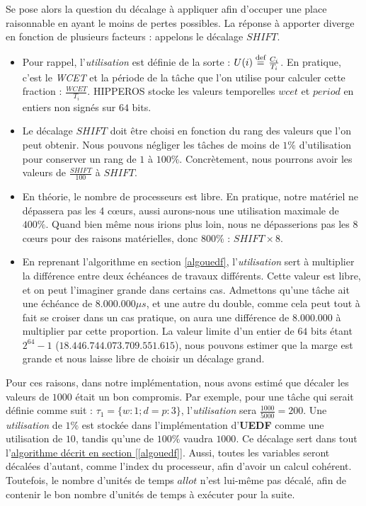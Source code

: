 		Se pose alors la question du décalage à appliquer afin d'occuper une place raisonnable en ayant 
		le moins de pertes possibles.  
		La réponse à apporter diverge en fonction de plusieurs facteurs :
		appelons le décalage $SHIFT$.
		\begin{itemize}
			\setlength\itemsep{0.1em}
			\item Pour rappel, l'\textit{utilisation} est définie de la sorte : $U(i) \stackrel{\text{def}}{=} \frac{C_i}{T_i}$. 
			En pratique, c'est le \textit{WCET} et la période de la tâche que l'on utilise pour calculer cette fraction : 
			$\frac{WCET}{T_i}$.
			HIPPEROS stocke les valeurs temporelles $wcet$ et $period$ en entiers non signés sur $64$ bits.
			
			\item Le décalage $SHIFT$ doit être choisi en fonction du rang des valeurs que l'on peut obtenir.
			Nous pouvons négliger les tâches de moins de $1 \%$ d'utilisation pour conserver un rang de $1$ à $100\%$.
			Concrètement, nous pourrons avoir les valeurs de $\frac{SHIFT}{100}$ à $SHIFT$.
			\item En théorie, le nombre de processeurs est libre. En pratique, 
			notre matériel ne dépassera pas les 4 cœurs, aussi aurons-nous une utilisation maximale de $400\%$.
			Quand bien même nous irions plus loin, nous ne dépasserions pas les 8 cœurs pour des raisons 
			matérielles, donc 800\% : $SHIFT \times 8$.
			\item En reprenant l'algorithme en section \ref{algouedf}, 
			l'\textit{utilisation} sert à multiplier la différence entre deux échéances de travaux différents.
			Cette valeur est libre, et on peut l'imaginer grande dans certains cas. 
			Admettons qu'une tâche ait une échéance de $8.000.000 \mu s$, et une autre du double, comme cela 
			peut tout à fait se croiser dans un cas pratique, on aura une différence de $8.000.000$ à multiplier
			par cette proportion. 
			La valeur limite d'un entier de $64$ bits étant $2^{64} - 1$ ($18.446.744.073.709.551.615$), nous pouvons estimer que la marge 
			est grande et nous laisse libre de choisir un décalage grand.
		\end{itemize}
		Pour ces raisons, dans notre implémentation, nous avons estimé que décaler les valeurs de $1000$ était un bon compromis.
		Par exemple, pour une tâche qui serait définie comme suit : $\tau_1 = \{w:1; d=p : 3\}$, 
		l'\textit{utilisation} sera $\frac{1000}{5000} = 200$.
		Une \textit{utilisation} de $1\%$ est stockée dans l'implémentation d'\textbf{UEDF} comme une utilisation de 
		$10$, tandis qu'une de $100\%$ vaudra $1000$. Ce décalage sert dans tout l'\hyperref[algouedf]{algorithme décrit en section [\ref*{algouedf}]}.
		Aussi, toutes les variables seront décalées d'autant, comme l'index du processeur, afin d'avoir un calcul cohérent. 
		Toutefois, le nombre d'unités de temps $allot$ 
		n'est lui-même pas décalé, afin de contenir le bon nombre d'unités de temps à exécuter pour la suite.		
		
